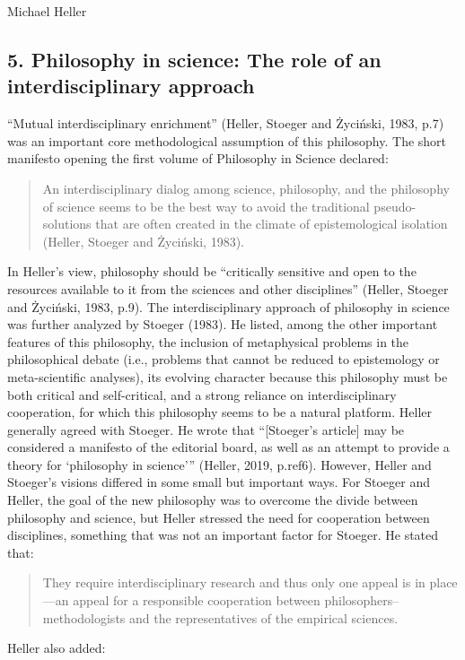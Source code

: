 \begin{artengenv}{Michael Heller}
\subsection{5. Philosophy in science: The role of an interdisciplinary approach}
“Mutual interdisciplinary enrichment” (Heller, Stoeger and Życiński, 1983, p.7) was an important core methodological
assumption of this philosophy. The short manifesto opening the first volume of Philosophy in Science declared:

\begin{quotation}
An interdisciplinary dialog among science, philosophy, and the philosophy of science seems to be the best way to avoid
the traditional pseudo-solutions that are often created in the climate of epistemological isolation (Heller, Stoeger
and Życiński, 1983).

\end{quotation}
In Heller’s view, philosophy should be “critically sensitive and open to the resources available to it from the sciences
and other disciplines” (Heller, Stoeger and Życiński, 1983, p.9). The interdisciplinary approach of philosophy in
science was further analyzed by Stoeger (1983). He listed, among the other important features of this philosophy, the
inclusion of metaphysical problems in the philosophical debate (i.e., problems that cannot be reduced to epistemology
or meta-scientific analyses), its evolving character because this philosophy must be both critical and self-critical,
and a strong reliance on interdisciplinary cooperation, for which this philosophy seems to be a natural platform.
Heller generally agreed with Stoeger. He wrote that “[Stoeger’s article] may be considered a manifesto of the editorial
board, as well as an attempt to provide a theory for ‘philosophy in science’” (Heller, 2019, p.ref6). However, Heller
and Stoeger’s visions differed in some small but important ways. For Stoeger and Heller, the goal of the new philosophy
was to overcome the divide between philosophy and science, but Heller stressed the need for cooperation between
disciplines, something that was not an important factor for Stoeger. He stated that: 

\begin{quotation}
They require interdisciplinary research and thus only one appeal is in place—an appeal for a responsible cooperation
between philosophers–methodologists and the representatives of the empirical sciences.

\end{quotation}
Heller also added:


\end{artengenv}
